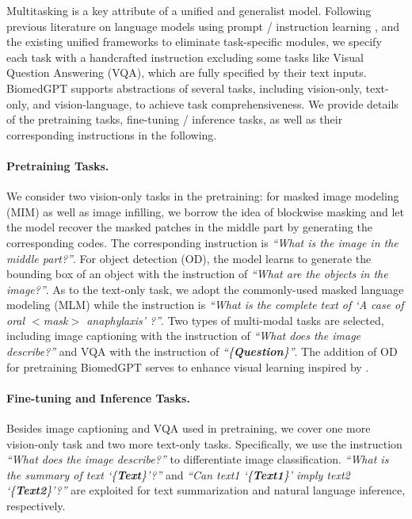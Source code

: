 \documentclass[10pt]{article} \usepackage[preprint]{tmlr}
\begin{document}
Multitasking is a key attribute of a unified and generalist model. Following previous literature on language models using prompt / instruction learning \citep{brown2020language, liu2023pre, weifinetuned, gao2021making, schick2021s}, and the existing unified frameworks to eliminate task-specific modules, we specify each task with a handcrafted instruction excluding some tasks like Visual Question Answering (VQA), which are fully specified by their text inputs. BiomedGPT supports abstractions of several tasks, including vision-only, text-only, and vision-language, to achieve task comprehensiveness. We provide details of the pretraining tasks, fine-tuning / inference tasks, as well as their corresponding instructions in the following. 
\paragraph{Pretraining Tasks.} We consider two vision-only tasks in the pretraining: for masked image modeling (MIM) as well as image infilling, we borrow the idea of blockwise masking \citep{DBLP:conf/iclr/Bao0PW22} and let the model recover the masked patches in the middle part by generating the corresponding codes. The corresponding instruction is \textit{``What is the image in the middle part?''}. For object detection (OD), the model learns to generate the bounding box of an object with the instruction of \textit{``What are the objects in the image?''}. As to the text-only task, we adopt the commonly-used masked language modeling (MLM) while the instruction is \textit{``What is the complete text of `A case of oral $<$mask$>$ anaphylaxis' ?''}. Two types of multi-modal tasks are selected, including image captioning with the instruction of \textit{``What does the image describe?''} and VQA with the instruction of \textit{``\{\textbf{Question}\}''}. The addition of OD for pretraining BiomedGPT serves to enhance visual learning inspired by \citep{xu2021e2e}.
\paragraph{Fine-tuning and Inference Tasks.} Besides image captioning and VQA used in pretraining, we cover one more vision-only task and two more text-only tasks. Specifically, we use the instruction \textit{``What does the image describe?''} to differentiate image classification. \textit{``What is the summary of text `\{\textbf{Text}\}'?''} and \textit{``Can text1 `\{\textbf{Text1}\}' imply text2 `\{\textbf{Text2}\}'?''} are exploited for text summarization and natural language inference, respectively. 
\end{document}
